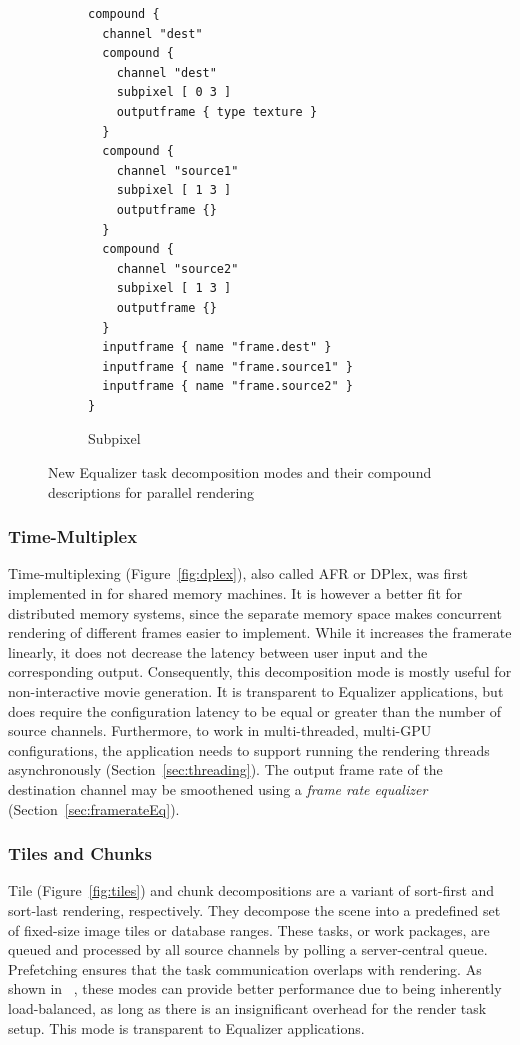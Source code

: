 \documentclass[10pt,journal,compsoc]{IEEEtran}
\newcommand{\sref}[1]{Section~\ref{#1}}
\newcommand{\fig}[1]{Figure~\ref{#1}}
\begin{document}
\begin{figure}[ht]
\begin{subfigure}[t]{0.24\textwidth}
{\begin{lstlisting}
compound {
  channel "dest"
  compound {
    channel "dest"
    subpixel [ 0 3 ]
    outputframe { type texture }
  }
  compound {
    channel "source1"
    subpixel [ 1 3 ]
    outputframe {}
  }
  compound {
    channel "source2"
    subpixel [ 1 3 ]
    outputframe {}
  }
  inputframe { name "frame.dest" }
  inputframe { name "frame.source1" }
  inputframe { name "frame.source2" }
}
    \end{lstlisting}\vspace{21ex}}
    \caption{\label{fig:subpixel}Subpixel}
  \end{subfigure}
  \caption{New \textsf{Equalizer} task decomposition modes and their compound
descriptions for parallel rendering}
  \label{fig:compounds}
\end{figure}


\subsubsection{Time-Multiplex}

Time-multiplexing (\fig{fig:dplex}), also called AFR or DPlex, was first
implemented in \cite{BRE:05} for shared memory machines. It is however a better
fit for distributed memory systems, since the separate memory space makes
concurrent rendering of different frames easier to implement. While it increases
the framerate linearly, it does not decrease the latency between user input and
the corresponding output. Consequently, this decomposition mode is mostly useful
for non-interactive movie generation. It is transparent to \textsf{Equalizer}
applications, but does require the configuration latency to be equal or greater
than the number of source channels. Furthermore, to work in multi-threaded,
multi-GPU configurations, the application needs to support running the rendering
threads asynchronously (\sref{sec:threading}). The output frame rate of the
destination channel may be smoothened using a {\em frame rate equalizer}
(\sref{sec:framerateEq}).

\subsubsection{Tiles and Chunks}\label{sec:tile}

Tile (\fig{fig:tiles}) and chunk decompositions are a variant of sort-first and
sort-last rendering, respectively. They decompose the scene into a predefined
set of fixed-size image tiles or database ranges. These tasks, or work packages,
are queued and processed by all source channels by polling a server-central
queue. Prefetching ensures that the task communication overlaps with rendering.
As shown in~ \cite{SPEP:16}, these modes can provide better performance due to
being inherently load-balanced, as long as there is an insignificant overhead
for the render task setup. This mode is transparent to \textsf{Equalizer}
applications.
\end{document}
